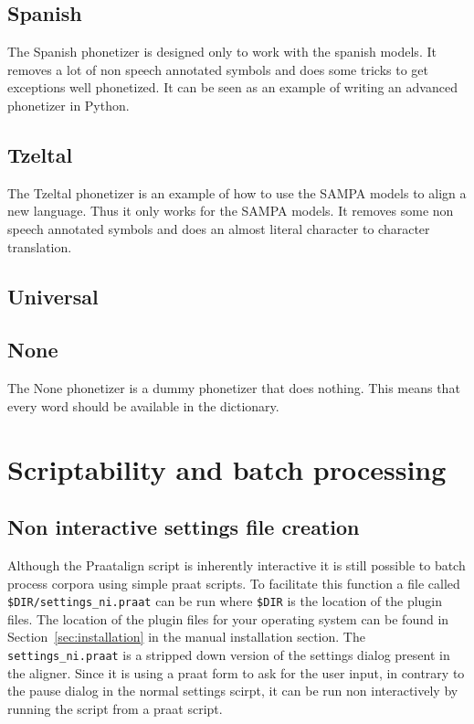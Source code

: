 \subsection{Spanish}
The Spanish phonetizer is designed only to work with the spanish models. It
removes a lot of non speech annotated symbols and does some tricks to get
exceptions well phonetized. It can be seen as an example of writing an advanced
phonetizer in Python.

\subsection{Tzeltal}
The Tzeltal phonetizer is an example of how to use the SAMPA models to align a
new language. Thus it only works for the SAMPA models. It removes some non
speech annotated symbols and does an almost literal character to character
translation.

\subsection{Universal}


\subsection{None}
The None phonetizer is a dummy phonetizer that does nothing. This means that
every word should be available in the dictionary.

\section{Scriptability and batch processing}
\subsection{Non interactive settings file creation}
Although the Praatalign script is inherently interactive it is still possible
to batch process corpora using simple praat scripts. To facilitate this
function a file called \texttt{\$DIR/settings\_ni.praat} can be run where
\texttt{\$DIR} is the location of the plugin files. The location of the plugin
files for your operating system can be found in Section~\ref{sec:installation}
in the manual installation section. The \texttt{settings\_ni.praat} is a
stripped down version of the settings dialog present in the aligner. Since it
is using a praat form to ask for the user input, in contrary to the pause
dialog in the normal settings scirpt, it can be run non interactively by
running the script from a praat script.

